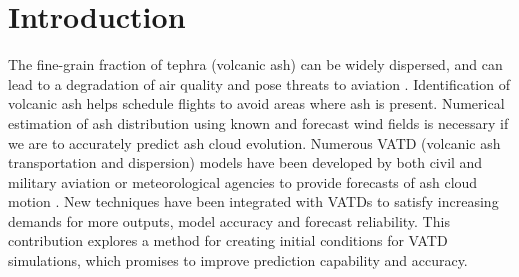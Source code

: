 \documentclass[utf8]{frontiersSCNS} %
\begin{document}
\section{Introduction}

The fine-grain fraction of tephra (volcanic ash) can be widely dispersed, and can lead to a degradation of air quality and pose threats to aviation \citep{tupper2007facing}. Identification of volcanic ash helps schedule flights to avoid areas where ash is present. Numerical estimation of ash distribution using known and forecast wind fields is necessary if we are to accurately predict ash cloud evolution. Numerous VATD (volcanic ash transportation and dispersion) models have been developed by both civil and military aviation or meteorological agencies to provide forecasts of ash cloud motion \citep{witham2007comparison}. New techniques have been integrated with VATDs to satisfy increasing demands for more outputs, model accuracy and forecast reliability. This contribution explores a method for creating initial conditions for VATD simulations, which promises to improve prediction capability and accuracy.
\end{document}
